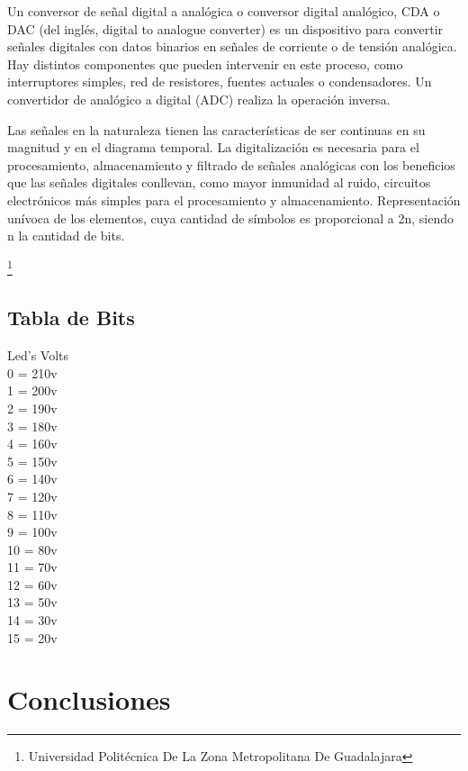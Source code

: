 \documentclass[10pt,a4paper]{article}
\begin{document}
Un conversor de señal digital a analógica o conversor digital analógico, CDA o DAC (del inglés, digital to analogue converter) es un dispositivo para convertir señales digitales con datos binarios en señales de corriente o de tensión analógica. Hay distintos componentes que pueden intervenir en este proceso, como interruptores simples, red de resistores, fuentes actuales o condensadores. Un convertidor de analógico a digital (ADC) realiza la operación inversa.

Las señales en la naturaleza tienen las características de ser continuas en su magnitud y en el diagrama temporal. La digitalización es necesaria para el procesamiento, almacenamiento y filtrado de señales analógicas con los beneficios que las señales digitales conllevan, como mayor inmunidad al ruido, circuitos electrónicos más simples para el procesamiento y almacenamiento. Representación unívoca de los elementos, cuya cantidad de símbolos es proporcional a 2n, siendo n la cantidad de bits.

\footnote{Universidad Politécnica De La Zona Metropolitana De Guadalajara} 

\newpage

\subsection{Tabla de Bits}
Led's    Volts\\
 0 =      210v\\
 1 =      200v\\
 2 =      190v\\
 3 =      180v\\
 4 =      160v\\
 5 =      150v\\
 6 =      140v\\
 7 =      120v\\
 8 =      110v\\
 9 =      100v\\
 10 =     80v\\
 11 =     70v\\
 12 =     60v\\
 13 =     50v\\
 14 =     30v\\
 15 =     20v

\section{Conclusiones}
\end{document}
